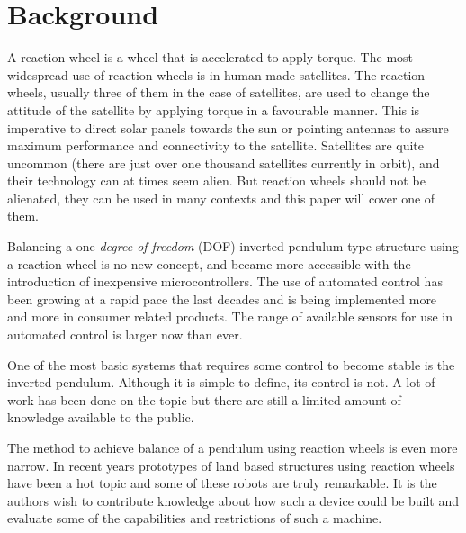 \documentclass[a4paper,11pt]{kth-mag}
\begin{document}
\section{Background}
A reaction wheel is a wheel that is accelerated to apply torque. The most widespread use of reaction wheels is in human made satellites. The  reaction wheels, usually three of them in the case of satellites, are used to change the attitude of the satellite by applying torque in a favourable manner. This is imperative to direct solar panels towards the sun or pointing antennas to assure maximum performance and connectivity to the satellite. Satellites are quite uncommon (there are just over one thousand satellites currently in orbit), and their technology can at times seem alien. But reaction wheels should not be alienated, they can be used in many contexts and this paper will cover one of them.  

Balancing a one \textit{degree of freedom} (DOF) inverted pendulum type structure using a reaction wheel is no new concept, and became more accessible with the introduction of inexpensive microcontrollers.
The use of automated control has been growing at a rapid pace the last decades and is being implemented
more and more in consumer related products. The range of available sensors for use in automated control is larger now than ever.


One of the most basic systems that requires some control to become stable is the inverted pendulum. 
Although it is simple to define, its control is not. A lot of work has been done on the topic
but there are still a limited amount of knowledge available to the public. 

The method to achieve balance of a pendulum using reaction wheels is even more narrow. 
In recent years prototypes of land based structures using reaction wheels have been a hot topic and some of these robots are truly remarkable. 
It is the authors wish to contribute knowledge about how such a device could be built and evaluate some of
the capabilities and restrictions of such a machine.
\end{document}
